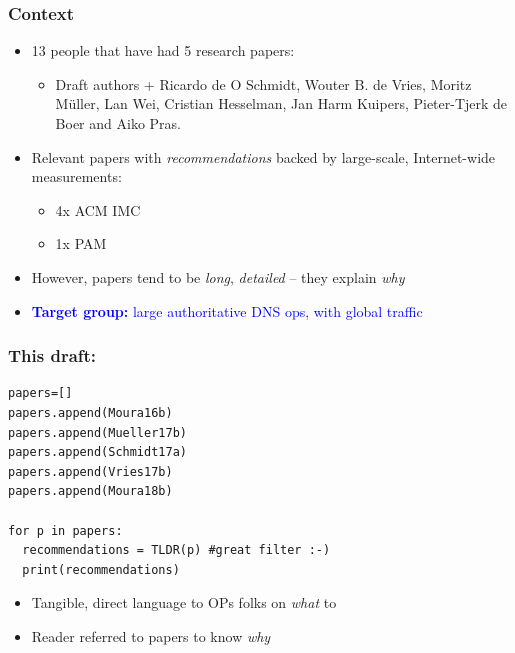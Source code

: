 \documentclass[11pt,show 
notes,notheorems,noamsthm,blank]{beamer} %
\begin{document}
\begin{frame}
 \frametitle{Context}
 
 \begin{itemize}

  \item 13 people that have had 5  research papers:
  \begin{itemize}
   \item \footnotesize Draft authors + Ricardo de O Schmidt, Wouter B. de 
Vries, Moritz M\"{u}ller, Lan Wei,  Cristian Hesselman, Jan Harm Kuipers, 
Pieter-Tjerk de Boer and Aiko  Pras.
  \end{itemize}

 \item Relevant papers with \textit{recommendations} backed by 
large-scale, Internet-wide measurements: 
\begin{itemize}
 \item 4x ACM IMC
 \item 1x PAM
\end{itemize}


\item However, papers tend to be \textit{long}, \textit{detailed} -- they 
explain \textit{why} 

 \item \textcolor{blue}{\textbf{Target group:} large authoritative DNS ops, 
with global traffic}

 \end{itemize}

\end{frame}



\begin{frame}[fragile]
 \frametitle{\textbf{This draft:}}
 
 

 \lstset{language=Python}
 \lstset{frame=lines}
  \lstset{basicstyle=\footnotesize}
  
  
\begin{lstlisting}
papers=[]
papers.append(Moura16b)
papers.append(Mueller17b)
papers.append(Schmidt17a)
papers.append(Vries17b)
papers.append(Moura18b)

for p in papers:
  recommendations = TLDR(p) #great filter :-)
  print(recommendations)
\end{lstlisting}

\begin{itemize}
 \item Tangible, direct language to OPs folks on \textit{what} to
\item Reader referred to papers to know \textit{why}
\end{itemize}


\end{frame}
\end{document}
